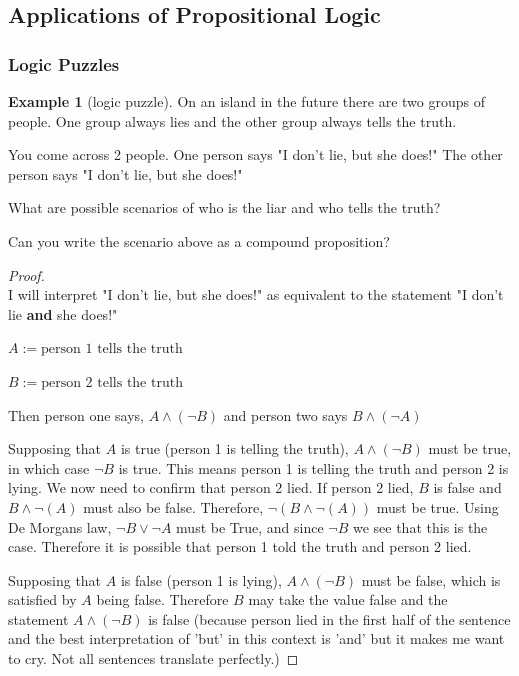 \documentclass[letterpaper,10pt]{article}
\theoremstyle{plain}
\theoremstyle{definition}
\newtheorem{exmp}[thm]{Example}
\theoremstyle{remark}
\providecommand{\land}{\ensuremath{\wedge}}
\providecommand{\lor}{\ensuremath{\vee}}
\begin{document}
\newpage
\subsection{Applications of Propositional Logic}

\subsubsection{Logic Puzzles}
\begin{exmp}[logic puzzle]

On an island in the future there are two groups of people. One group always lies and the other group always tells the truth.

You come across 2 people.
One person says "I don't lie, but she does!"
The other person says "I don't lie, but she does!"

What are possible scenarios of who is the liar and who tells the truth?

Can you write the scenario above as a compound proposition?

\begin{proof} \ \\
I will interpret "I don't lie, but she does!" as equivalent to the statement "I don't lie \textbf{and} she does!"

$A:=\text{person 1 tells the truth}$

$B:=\text{person 2 tells the truth}$

Then person one says, $A\land (\lnot B)$
and person two says $B\land (\lnot A)$

Supposing that $A$ is true (person 1 is telling the truth), $A\land (\lnot B)$ must be true, in which case $\lnot B $ is true. This means person 1 is telling the truth and person 2 is lying. 
We now need to confirm that person 2 lied. If person 2 lied, $B$ is false and $B \land \lnot(A)$ must also be false. Therefore, $\lnot(B \land \lnot(A))$ must be true. Using De Morgans law, $\lnot B \lor \lnot A$ must be True, and since $\lnot B$ we see that this is the case. Therefore it is possible that person 1 told the truth and person 2 lied.

Supposing that $A$ is false (person 1 is lying), $A\land (\lnot B)$ must be false, which is satisfied by $A$ being false. Therefore $B$ may take the value false and the statement $A\land (\lnot B)$ is false (because person lied in the first half of the sentence and the best interpretation of 'but' in this context is 'and' but it makes me want to cry. Not all sentences translate perfectly.)

\end{proof}

\end{exmp}
\end{document}
